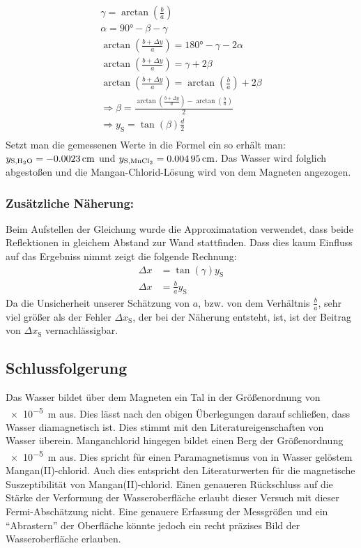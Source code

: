 \documentclass[
	a4paper,
	12pt,
	pagesize,
	ngerman
]{scrartcl}
\begin{document}
	\begin{gather*}
		\gamma = \arctan \left(\frac{b}{a}\right) \\
		\alpha = \ang{90} - \beta - \gamma \\
		\arctan \left(\frac{b+\Delta y}{a}\right) = \ang{180} - \gamma - 2\alpha \\
		\arctan \left(\frac{b+\Delta y}{a}\right) = \gamma + 2 \beta \\
		\arctan \left(\frac{b+\Delta y}{a}\right) =   \arctan \left(\frac{b}{a}\right) + 2 \beta \\
		\Rightarrow \beta = \frac{\arctan \left(\frac{b+\Delta y}{a}\right) -  \arctan \left(\frac{b}{a}\right)}{2} \\
		\Rightarrow y_\text{S} = \tan (\beta) \frac{d}{2}  \\
	\end{gather*}
	Setzt man die gemessenen Werte in die Formel ein so erhält man: $ y_{\text{S,\ce{H2O}}} = \SI{-0,0023}{ cm} $ und $y_{\text{S,\ce{MnCl2}}} = \SI{0,00495}{ cm} $. Das Wasser wird folglich abgestoßen und die Mangan-Chlorid-Lösung wird von dem Magneten angezogen.
	
	\subsubsection*{Zusätzliche Näherung:}
	Beim Aufstellen der Gleichung wurde die Approximatation verwendet, dass beide Reflektionen in gleichem Abstand zur Wand stattfinden. Dass dies kaum Einfluss auf das Ergebniss nimmt zeigt die folgende Rechnung:
	\begin{align*}
		\Delta x &= \tan (\gamma) y_\text{S} \\
		\Delta x &= \frac{b}{a} y_\text{S}
	\end{align*}
	Da die Unsicherheit unserer Schätzung von $a$, bzw. von dem Verhältnis $\frac{b}{a}$, sehr viel größer als der Fehler $\Delta x_\text{S}$, der bei der Näherung entsteht, ist, ist der Beitrag von $\Delta x_\text{S}$ vernachlässigbar.

	\subsection{Schlussfolgerung}
	Das Wasser bildet über dem Magneten ein Tal in der Größenordnung von \SI{e-5}{m} aus. Dies lässt nach den obigen Überlegungen darauf schließen, dass Wasser diamagnetisch ist. Dies stimmt mit den Literatureigenschaften von Wasser überein.
	Manganchlorid hingegen bildet einen Berg der Größenordnung \SI{e-5}{m} aus. Dies spricht für einen Paramagnetismus von in Wasser gelöstem Mangan(II)-chlorid. Auch dies entspricht den Literaturwerten für die magnetische Suszeptibilität von Mangan(II)-chlorid. Einen genaueren Rückschluss auf die Stärke der Verformung der Wasseroberfläche erlaubt dieser Versuch mit dieser Fermi-Abschätzung nicht. Eine genauere Erfassung der Messgrößen und ein \enquote{Abrastern} der Oberfläche könnte jedoch ein recht präzises Bild der Wasseroberfläche erlauben.
	
\end{document}
